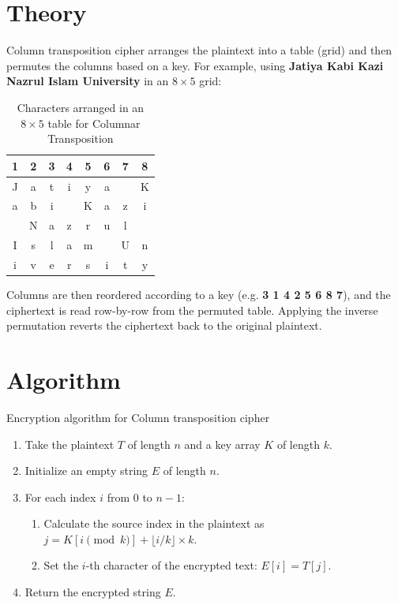 
\section{Theory}
Column transposition cipher arranges the plaintext into a table (grid) and then permutes the columns based on a key. For example, using \textbf{Jatiya Kabi Kazi Nazrul Islam University} in an $8 \times 5$ grid:

\begin{table}[H]
\centering
\begin{tabular}{|c|c|c|c|c|c|c|c|}
\hline
1 & 2 & 3 & 4 & 5 & 6 & 7 & 8 \\ \hline
J & a & t & i & y & a & \textvisiblespace & K \\ \hline
a & b & i & \textvisiblespace & K & a & z & i \\ \hline
\textvisiblespace & N & a & z & r & u & l & \textvisiblespace \\ \hline
I & s & l & a & m & \textvisiblespace & U & n \\ \hline
i & v & e & r & s & i & t & y \\ \hline
\end{tabular}
\caption{Characters arranged in an $8 \times 5$ table for Columnar Transposition}
\end{table}

Columns are then reordered according to a key (e.g. \textbf{3 1 4 2 5 6 8 7}), and the ciphertext is read row-by-row from the permuted table. Applying the inverse permutation reverts the ciphertext back to the original plaintext.

\section{Algorithm}
Encryption algorithm for Column transposition cipher
\begin{enumerate}
  \item Take the plaintext $T$ of length $n$ and a key array $K$ of length $k$.
  \item Initialize an empty string $E$ of length $n$.
  \item For each index $i$ from $0$ to $n-1$:
  \begin{enumerate}
    \item Calculate the source index in the plaintext as $j = K[i \pmod k] + \lfloor i / k \rfloor \times k$.
    \item Set the $i$-th character of the encrypted text: $E[i] = T[j]$.
  \end{enumerate}
  \item Return the encrypted string $E$.
\end{enumerate}

